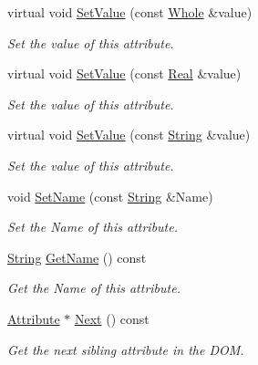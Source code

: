 \begin{DoxyCompactItemize}
virtual void \hyperlink{classphys_1_1xml_1_1Attribute_a45b441e83fb3c6e0cc911019b61039ba}{SetValue} (const \hyperlink{namespacephys_a460f6bc24c8dd347b05e0366ae34f34a}{Whole} \&value)
\begin{DoxyCompactList}\small\item\em Set the value of this attribute. \item\end{DoxyCompactList}\item 
virtual void \hyperlink{classphys_1_1xml_1_1Attribute_ad2ba3ccf96388f0c859bc90e45ed94ab}{SetValue} (const \hyperlink{namespacephys_af7eb897198d265b8e868f45240230d5f}{Real} \&value)
\begin{DoxyCompactList}\small\item\em Set the value of this attribute. \item\end{DoxyCompactList}\item 
virtual void \hyperlink{classphys_1_1xml_1_1Attribute_ad06e8d677bfa76d43936bd97ac3e62ef}{SetValue} (const \hyperlink{namespacephys_aa03900411993de7fbfec4789bc1d392e}{String} \&value)
\begin{DoxyCompactList}\small\item\em Set the value of this attribute. \item\end{DoxyCompactList}\item 
void \hyperlink{classphys_1_1xml_1_1Attribute_a9c90f6c8b6c409309fd503e1fe4a71bd}{SetName} (const \hyperlink{namespacephys_aa03900411993de7fbfec4789bc1d392e}{String} \&Name)
\begin{DoxyCompactList}\small\item\em Set the Name of this attribute. \item\end{DoxyCompactList}\item 
\hyperlink{namespacephys_aa03900411993de7fbfec4789bc1d392e}{String} \hyperlink{classphys_1_1xml_1_1Attribute_a30314ef60f51e5e161ee4d9e2b6fbd6c}{GetName} () const 
\begin{DoxyCompactList}\small\item\em Get the Name of this attribute. \item\end{DoxyCompactList}\item 
\hyperlink{classphys_1_1xml_1_1Attribute}{Attribute} $\ast$ \hyperlink{classphys_1_1xml_1_1Attribute_ad22d40ee0f3e7dcd431ecaa1cf3b9a95}{Next} () const 
\begin{DoxyCompactList}\small\item\em Get the next sibling attribute in the DOM. \item\end{DoxyCompactList}\item 

\end{DoxyCompactItemize}
